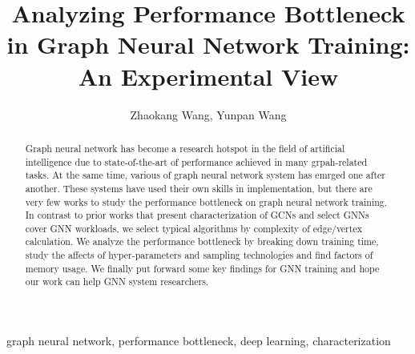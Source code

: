 \documentclass{elsarticle}
\begin{document}
\begin{frontmatter}

	\title{Analyzing Performance Bottleneck in Graph Neural Network Training: An Experimental View}
	\author{Zhaokang Wang, Yunpan Wang}%
	\address{State Key Laboratory for Novel Software Technology, \\Department of Computer Science and Technology, Nanjing University, \\Nanjing 210023, China}

	\begin{abstract}
		Graph neural network has become a research hotspot in the field of artificial intelligence due to state-of-the-art of performance
		achieved in many grpah-related tasks. At the same time, various of graph neural network system has emrged one after another.
		These systems have used their own skills in implementation, but there are very few works to study the performance bottleneck
		on graph neural network training. In contrast to prior works that present characterization of GCNs and select GNNs cover GNN workloads,
		we select typical algorithms by complexity of edge/vertex calculation. We analyze the performance bottleneck by breaking down training
		time, study the affects of hyper-parameters and sampling technologies and find factors of memory usage. We finally put forward some key
		findings for GNN training and hope our work can help GNN system researchers.
	\end{abstract}

	\begin{keyword}
		graph neural network, performance bottleneck, deep learning, characterization
	\end{keyword}

\end{frontmatter}

\linenumbers











\end{document}
